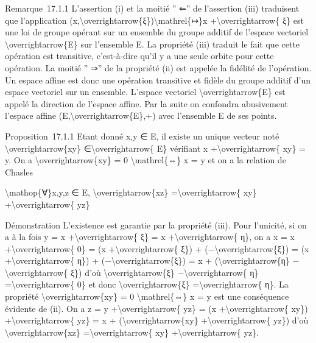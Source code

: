 \documentclass[]{article}
\begin{document}
Remarque~17.1.1 L'assertion (i) et la moitié '' ⇐'' de l'assertion (iii)
traduisent que l'application
(x,\textbackslash{}overrightarrow\{ξ\})\textbackslash{}mathrel\{↦\}x
+\textbackslash{}overrightarrow\{ ξ\} est une loi de groupe opérant sur
un ensemble du groupe additif de l'espace vectoriel
\textbackslash{}overrightarrow\{E\} sur l'ensemble E. La propriété (iii)
traduit le fait que cette opération est transitive, c'est-à-dire qu'il y
a une seule orbite pour cette opération. La moitié '' ⇒'' de la
propriété (ii) est appelée la fidélité de l'opération. Un espace affine
est donc une opération transitive et fidèle du groupe additif d'un
espace vectoriel sur un ensemble. L'espace vectoriel
\textbackslash{}overrightarrow\{E\} est appelé la direction de l'espace
affine. Par la suite on confondra abusivement l'espace affine
(E,\textbackslash{}overrightarrow\{E\},+) avec l'ensemble E de ses
points.

Proposition~17.1.1 Etant donné x,y ∈ E, il existe un unique vecteur noté
\textbackslash{}overrightarrow\{xy\} ∈\textbackslash{}overrightarrow\{
E\} vérifiant x +\textbackslash{}overrightarrow\{ xy\} = y. On a
\textbackslash{}overrightarrow\{xy\} = 0 \textbackslash{}mathrel\{⇔\} x
= y et on a la relation de Chasles

\textbackslash{}mathop\{∀\}x,y,z ∈ E,
\textbackslash{}overrightarrow\{xz\} =\textbackslash{}overrightarrow\{
xy\} +\textbackslash{}overrightarrow\{ yz\}

Démonstration L'existence est garantie par la propriété (iii). Pour
l'unicité, si on a à la fois y = x +\textbackslash{}overrightarrow\{ ξ\}
= x +\textbackslash{}overrightarrow\{ η\}, on a x = x
+\textbackslash{}overrightarrow\{ 0\} = (x
+\textbackslash{}overrightarrow\{ ξ\}) +
(−\textbackslash{}overrightarrow\{ξ\}) = (x
+\textbackslash{}overrightarrow\{ η\}) +
(−\textbackslash{}overrightarrow\{ξ\}) = x +
(\textbackslash{}overrightarrow\{η\} −\textbackslash{}overrightarrow\{
ξ\}) d'où \textbackslash{}overrightarrow\{ξ\}
−\textbackslash{}overrightarrow\{ η\} =\textbackslash{}overrightarrow\{
0\} et donc \textbackslash{}overrightarrow\{ξ\}
=\textbackslash{}overrightarrow\{ η\}. La propriété
\textbackslash{}overrightarrow\{xy\} = 0 \textbackslash{}mathrel\{⇔\} x
= y est une conséquence évidente de (ii). On a z = y
+\textbackslash{}overrightarrow\{ yz\} = (x
+\textbackslash{}overrightarrow\{ xy\})
+\textbackslash{}overrightarrow\{ yz\} = x +
(\textbackslash{}overrightarrow\{xy\} +\textbackslash{}overrightarrow\{
yz\}) d'où \textbackslash{}overrightarrow\{xz\}
=\textbackslash{}overrightarrow\{ xy\} +\textbackslash{}overrightarrow\{
yz\}.
\end{document}
